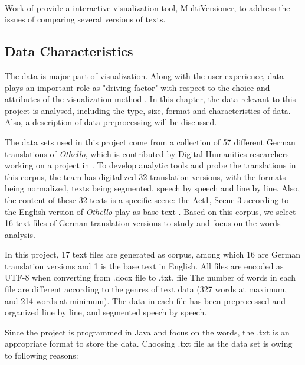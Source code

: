 \paragraph[]{}Work of \cite{Jong2008} provide a interactive visualization tool, MultiVersioner, to address the issues of comparing several versions of texts.


\subsection{Data Characteristics}

The data is major part of visualization. Along with the user experience, data plays an important role as "driving factor" with respect to the choice and attributes of the visualization method \cite{Laramee}. In this chapter, the data relevant to this project is analysed, including the type, size, format and characteristics of data. Also, a description of data preprocessing will be discussed. 

The data sets used in this project come from a collection of 57 different German translations of \emph{Othello}, which is contributed by Digital Humanities researchers working on a project in \cite{Tom2012}. To develop analytic tools and probe the translations in this corpus, the team has digitalized 32 translation versions, with the formats being normalized, texts being segmented, speech by speech and line by line. Also, the content of these 32 texts is a specific scene: the Act1, Scene 3 according to the English version of \emph{Othello} play as base text . Based on this corpus, we select 16 text files of German translation versions to study and focus on the words analysis. 

In this project, 17 text files are generated as corpus, among which 16 are German translation versions and 1 is the base text in English. All files are encoded as UTF-8 when converting from .docx file to .txt. file The number of words in each file are different according to the genres of text data (327 words at maximum, and 214 words at minimum). The data in each file has been preprocessed and organized line by line, and segmented speech by speech. 

Since the project is programmed in Java and focus on the words, the .txt is an appropriate format to store the data. Choosing .txt file as the data set is owing to following reasons:

